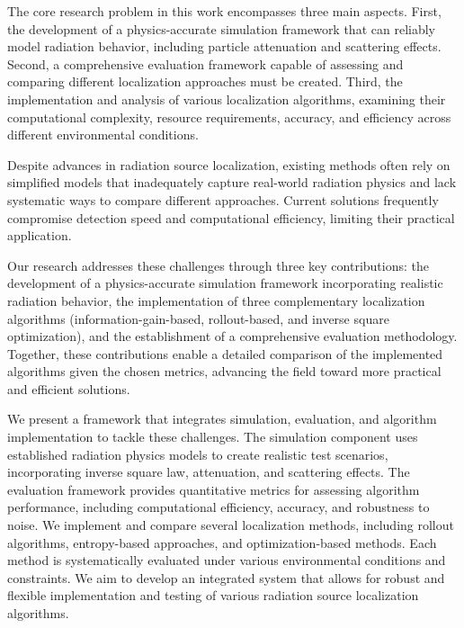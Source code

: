 \documentclass[../report.tex]{subfiles}
\begin{document}
    The core research problem in this work encompasses three main aspects. First, the development of a physics-accurate simulation framework that can reliably model radiation behavior, including particle 
    attenuation and scattering effects. Second, a comprehensive evaluation framework capable of assessing and comparing different localization approaches must be created. Third, the 
    implementation and analysis of various localization algorithms, examining their computational complexity, resource requirements, accuracy, and efficiency across different environmental conditions.
    \label{sec:introduction:proposed_approach}

    Despite advances in radiation source localization, existing methods often rely on simplified models that inadequately capture real-world radiation physics and 
    lack systematic ways to compare different approaches. Current solutions frequently compromise detection speed and computational efficiency, limiting their 
    practical application.
    
    
    Our research addresses these challenges through three key contributions: the development of a physics-accurate simulation framework incorporating realistic 
    radiation behavior, the implementation of three complementary localization algorithms (information-gain-based, rollout-based, and inverse square optimization), 
    and the establishment of a comprehensive evaluation methodology. Together, these contributions enable a detailed comparison of the implemented algorithms given 
    the chosen metrics, advancing the field toward more practical and efficient solutions.

    We present a framework that integrates simulation, evaluation, and algorithm implementation to tackle these challenges. The simulation component uses established radiation physics models 
    to create realistic test scenarios, incorporating inverse square law, attenuation, and scattering effects. The evaluation framework provides quantitative metrics for assessing algorithm 
    performance, including computational efficiency, accuracy, and robustness to noise. We implement and compare several localization methods, including rollout algorithms, entropy-based 
    approaches, and optimization-based methods. Each method is systematically evaluated under various environmental conditions and constraints. We aim to develop an integrated system that 
    allows for robust and flexible implementation and testing of various radiation source localization algorithms.
\end{document}

